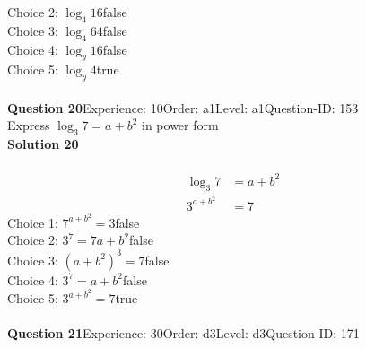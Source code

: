 \documentclass{article}
\begin{document}
Choice 2: \hspace{20pt}$\log_{4}16$\hspace{20pt}false\\
Choice 3: \hspace{20pt}$\log_{4}64$\hspace{20pt}false\\
Choice 4: \hspace{20pt}$\log_{y}16$\hspace{20pt}false\\
Choice 5: \hspace{20pt}$\log_{y}4$\hspace{20pt}true\\
\\[4pt]
\noindent\textbf{Question 20}\hspace{20pt}Experience: 10\hspace{20pt}Order: a1\hspace{20pt}Level: a1\hspace{20pt}Question-ID: 153\\[2pt]
Express $\log_{3}7=a+b^2$ in power form\\[4pt]
\noindent\textbf{Solution 20}\\[2pt]
\\[-35pt]\begin{align*}
\log_{3}7&=a+b^2\\[2pt]
3^{a+b^2}&=7
\end{align*}
Choice 1: \hspace{20pt}$7^{a+b^2}=3$\hspace{20pt}false\\
Choice 2: \hspace{20pt}$3^7=7a+b^2$\hspace{20pt}false\\
Choice 3: \hspace{20pt}$(a+b^2)^3=7$\hspace{20pt}false\\
Choice 4: \hspace{20pt}$3^{7}=a+b^2$\hspace{20pt}false\\
Choice 5: \hspace{20pt}$3^{a+b^2}=7$\hspace{20pt}true\\
\\[4pt]
\noindent\textbf{Question 21}\hspace{20pt}Experience: 30\hspace{20pt}Order: d3\hspace{20pt}Level: d3\hspace{20pt}Question-ID: 171\\[2pt]
\end{document}
